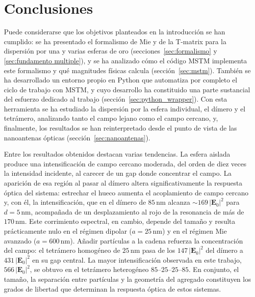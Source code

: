 \section{Conclusiones}
\label{sec:conclusiones}

Puede considerarse que los objetivos planteados en la introducción se han 
cumplido: se ha presentado el formalismo de Mie y de la T-matrix para la
dispersión por una y varias esferas de oro (secciones~\ref{sec:formalismo} y \ref{sec:fundamento multiple}), y se ha
analizado cómo el código MSTM implementa este formalismo y qué
magnitudes físicas calcula (sección~\ref{sec:mstm}). También se ha
desarrollado un entorno propio en Python que automatiza por completo el ciclo
de trabajo con MSTM, y cuyo 
desarrollo ha constituido una parte sustancial del
esfuerzo dedicado al trabajo (sección~\ref{sec:python_wrapper}). Con esta
herramienta se ha estudiado la dispersión por la esfera individual, el dímero
y el tetrámero, analizando tanto el campo lejano como el campo cercano, y,
finalmente, los resultados se han reinterpretado desde el punto de vista de
las nanoantenas ópticas (sección~\ref{sec:nanoantenas}).

Entre los resultados obtenidos destacan varias tendencias. La esfera aislada
produce una intensificación de campo cercano moderada, del orden de diez
veces la intensidad incidente, al carecer de un gap donde concentrar el
campo. La aparición de esa región al pasar al dímero altera significativamente 
la respuesta óptica del sistema: estrechar el hueco aumenta el acoplamiento 
de campo cercano y, con él, la intensificación, 
que en el dímero de $85\,\text{nm}$ alcanza
$\sim\!169\,|\mathbf{E}_0|^2$ para $d=5\,\text{nm}$, acompañada de un
desplazamiento al rojo de la resonancia de más de $170\,\text{nm}$. Este
corrimiento espectral, en cambio, depende del tamaño y resulta prácticamente
nulo en el régimen dipolar ($a=25\,\text{nm}$) y en el régimen Mie avanzado
($a=600\,\text{nm}$). Añadir partículas a la cadena refuerza la concentración
del campo: el tetrámero homogéneo de $25\,\text{nm}$ pasa de los
$147\,|\mathbf{E}_0|^2$ del dímero a $431\,|\mathbf{E}_0|^2$ en su gap
central. La mayor intensificación observada en este trabajo,
$566\,|\mathbf{E}_0|^2$, se obtuvo en el tetrámero heterogéneo
$85$--$25$--$25$--$85$. En conjunto, el tamaño, la separación
entre partículas y la geometría del agregado constituyen los 
grados de libertad que determinan la respuesta óptica de estos sistemas.

